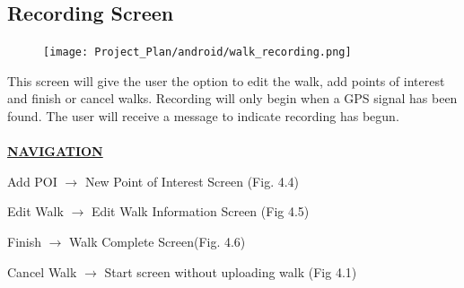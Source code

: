 \documentclass[12pt]{article}
\begin{document}
\subsection{Recording Screen}
\begin{figure}[htp]
\centering
\texttt{[image: Project\_Plan/android/walk\_recording.png]}
\caption{}
\label{}
\end{figure}
\par{This screen will give the user the option to edit the walk, add points of interest and finish or cancel walks. Recording will only begin when a GPS signal has been found. The user will receive a message to indicate recording has begun.\\ \\}
\textbf{\uline{NAVIGATION}}
\par{Add POI $\rightarrow$ New Point of Interest Screen (Fig. 4.4)}
\par{Edit Walk $\rightarrow$ Edit Walk Information Screen (Fig 4.5)}
\par{Finish $\rightarrow$ Walk Complete Screen(Fig. 4.6)}
\par{Cancel Walk $\rightarrow$ Start screen without uploading walk (Fig 4.1)}
\newpage
\end{document}
